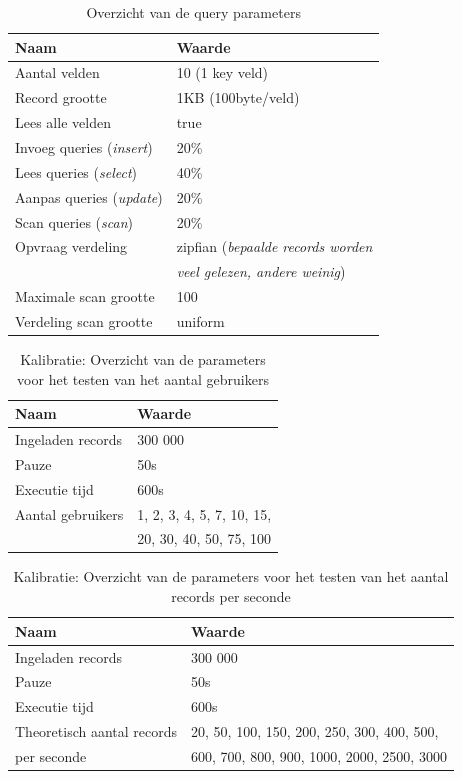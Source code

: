 \begin{table}[htb!]
	\centering
	\begin{tabular}{l| l }
	\textbf{Naam} & \textbf{Waarde} \\
	\hline
	Aantal velden & 10 (1 key veld) \\
	Record grootte & 1KB (100byte/veld) \\
	Lees alle velden & true \\
	Invoeg queries (\textit{insert}) & 20\%\\
	Lees queries (\textit{select}) & 40\%\\
	Aanpas queries (\textit{update}) & 20\%\\
	Scan queries (\textit{scan}) & 20\%\\
	Opvraag verdeling & zipfian (\textit{bepaalde records worden} \\
	& \textit{veel gelezen, andere weinig}) \\
	Maximale scan grootte & 100 \\
	Verdeling scan grootte & uniform \\
	\end{tabular}
	\caption{Overzicht van de query parameters}
	\label{table:calibratiequeries}
\end{table}

\begin{table}[htb!]
	\centering
	\begin{tabular}{l| l}
	\textbf{Naam} & \textbf{Waarde}  \\
	\hline
	Ingeladen records  & 300 000 \\
	Pauze & 50s \\
	Executie tijd & 600s \\
	Aantal gebruikers & 1, 2, 3, 4, 5, 7, 10, 15, \\
	& 20, 30, 40, 50, 75, 100\\
	\end{tabular}
	\caption{Kalibratie: Overzicht van de parameters voor het testen van het aantal gebruikers}
	\label{table:calibratiegebruikers}
\end{table}

\begin{table}[htb!]
	\centering
	\begin{tabular}{l| l  }
		\textbf{Naam} & \textbf{Waarde}  \\
		\hline
		Ingeladen records  & 300 000  \\
		Pauze & 50s  \\
		Executie tijd & 600s \\
		Theoretisch aantal records & 20, 50, 100, 150, 200, 250, 300, 400, 500, \\
		per seconde  & 600, 700, 800,  900, 1000, 2000, 2500, 3000\\
	\end{tabular}
	\caption{Kalibratie: Overzicht van de parameters voor het testen van het aantal records per seconde}
	\label{table:calibratiequeriesperseconde}
\end{table}

